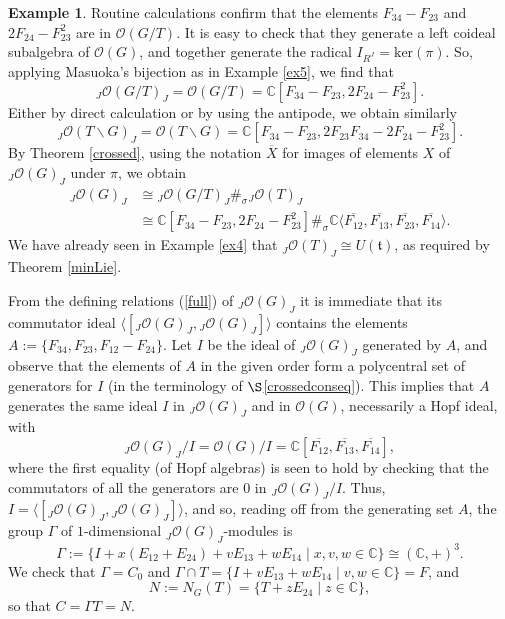 \documentclass{amsart}
\numberwithin{equation}{section}
\theoremstyle{definition}
\newtheorem{example}[theorem]{Example}
\begin{document}
\begin{example}
 Routine calculations confirm that the elements $F_{34} - F_{23}$ and $2F_{24} - F_{23}^2$ are in $\mathcal{O}(G/T)$. It is easy to check that they generate a left coideal subalgebra of $\mathcal{O}(G)$, and together generate the radical $I_{R^J} = \mathrm{ker}(\pi)$. So, applying Masuoka's bijection as in Example \ref{ex5}, we find that 
$$ {}_J\mathcal{O}(G/T)_J=\mathcal{O}(G/T)=\mathbb{C}[F_{34} - F_{23}, 2F_{24} - F_{23}^2]. $$
Either by direct calculation or by using the antipode, we obtain similarly 
$${}_J\mathcal{O}(T\backslash G)_J =\mathcal{O}(T\backslash G) = \mathbb{C}[F_{34} - F_{23}, 2F_{23}F_{34} - 2F_{24} - F_{23}^2].$$
By Theorem \ref{crossed}, using the notation $\overline{X}$ for images of elements $X$ of ${}_J\mathcal{O}(G)_J$ under $\pi$, we obtain
\begin{align*} 
{}_J\mathcal{O}(G)_J  &\cong  {}_J\mathcal{O}(G/T)_J \#_{\sigma} {}_J\mathcal{O}(T)_J\\
&\cong  \mathbb{C}[F_{34} - F_{23}, 2F_{24} - F_{23}^2] \#_{\sigma} \mathbb{C}\langle \overline{F_{12}}, \overline{F_{13}}, \overline{F_{23}},\overline{F_{14}}\rangle.
\end{align*}
We have already seen in Example \ref{ex4} that ${}_J\mathcal{O}(T)_J \cong U(\mathfrak{t})$, as required by Theorem \ref{minLie}.
\medskip

 From the defining relations (\ref{full}) of ${}_J\mathcal{O}(G)_J$ it is immediate that its commutator ideal $\langle [{}_J\mathcal{O}(G)_J, {}_J\mathcal{O}(G)_J]\rangle$ contains the elements $A:= \{F_{34}, F_{23}, F_{12} - F_{24}\}$. Let $I$ be the ideal of ${}_J\mathcal{O}(G)_J$ generated by $A$, and observe that the elements of $A$ in the given order form a polycentral set of generators for $I$ (in the terminology of $\S$\ref{crossedconseq}). This implies that $A$ generates the same ideal $I$ in ${}_J\mathcal{O}(G)_J$ and in $\mathcal{O}(G)$, necessarily a Hopf ideal, with
$${}_J\mathcal{O}(G)_J/I = \mathcal{O}(G)/I =  \mathbb{C}[\overline{F_{12}},\overline{F_{13}}, \overline{F_{14}}],$$ 
where the first equality (of Hopf algebras) is seen to hold by checking that the commutators of all the generators are $0$ in ${}_J\mathcal{O}(G)_J/I$.  Thus, $I = \langle [{}_J\mathcal{O}(G)_J, {}_J\mathcal{O}(G)_J]\rangle$, and so, reading off from the generating set $A$, the group $\Gamma$ of $1$-dimensional ${}_J\mathcal{O}(G)_J$-modules is
$$ \Gamma := \{I +  x(E_{12} + E_{24}) +  vE_{13} + wE_{14}\mid x, v,w \in \mathbb{C}\} \cong (\mathbb{C},+)^3.$$
We check that $\Gamma = C_0$ and $\Gamma \cap T = \{I  + vE_{13} + wE_{14}\mid  v,w \in \mathbb{C}\} = F$, and 
$$ N :=  N_G(T) = \{ T + zE_{24}\mid  z \in \mathbb{C} \}, $$
so that $C = \Gamma T = N$. 
\medskip


\end{example}
\end{document}
